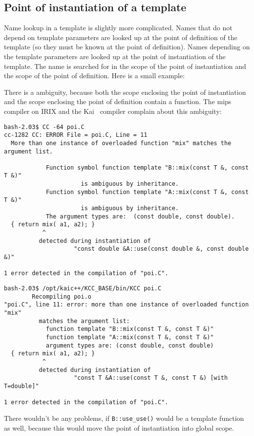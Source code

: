 \subsection{Point of instantiation of a template}
Name lookup in a template is slightly more complicated.
Names that do not depend on template parameters are looked up at the point
of definition of the template%
(so they must be known at the point of definition). 
Names depending on the template parameters are looked up at
the point of instantiation%
 of the template. 
The name is searched for in the
scope of the point of instantiation and the scope of the
point of definition. Here is a small example:


There is a ambiguity, because both the scope enclosing the point of 
instantiation and the scope enclosing the point of definition contain
a  function. The mips compiler on {\sc IRIX} and the Kai \CC\
compiler complain about this ambiguity: 

{\footnotesize
\begin{verbatim}
bash-2.03$ CC -64 poi.C 
cc-1282 CC: ERROR File = poi.C, Line = 11
  More than one instance of overloaded function "mix" matches the argument list.

            Function symbol function template "B::mix(const T &, const T &)"
                      is ambiguous by inheritance.
            Function symbol function template "A::mix(const T &, const T &)"
                      is ambiguous by inheritance.
            The argument types are:  (const double, const double).
  { return mix( a1, a2); }
           ^
          detected during instantiation of
                    "const double &A::use(const double &, const double &)" 

1 error detected in the compilation of "poi.C".
\end{verbatim}

\bigskip
\begin{verbatim}
bash-2.03$ /opt/kaic++/KCC_BASE/bin/KCC poi.C
        Recompiling poi.o
"poi.C", line 11: error: more than one instance of overloaded function "mix"
          matches the argument list:
            function template "B::mix(const T &, const T &)"
            function template "A::mix(const T &, const T &)"
            argument types are: (const double, const double)
  { return mix( a1, a2); }
           ^
          detected during instantiation of
                    "const T &A::use(const T &, const T &) [with T=double]" 

1 error detected in the compilation of "poi.C".
\end{verbatim}

}
There wouldn't be any problems, if \verb+B::use_use()+ would be a template
function as well, because this would move the point of instantiation
into global scope.

